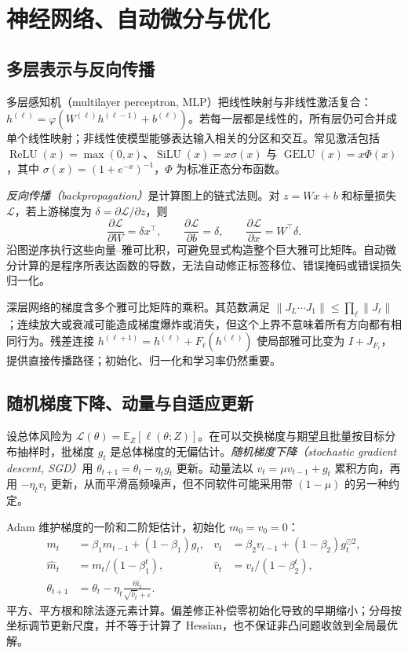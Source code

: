 \setcounter{chapter}{2} %
\chapter{神经网络、自动微分与优化}
\label{ch:optimization}

\section{多层表示与反向传播}

多层感知机（multilayer perceptron, MLP）把线性映射与非线性激活复合：$h^{(\ell)}=\varphi(W^{(\ell)}h^{(\ell-1)}+b^{(\ell)})$。若每一层都是线性的，所有层仍可合并成单个线性映射；非线性使模型能够表达输入相关的分区和交互。常见激活包括 $\operatorname{ReLU}(x)=\max(0,x)$、$\operatorname{SiLU}(x)=x\sigma(x)$ 与 $\operatorname{GELU}(x)=x\Phi(x)$，其中 $\sigma(x)=(1+e^{-x})^{-1}$，$\Phi$ 为标准正态分布函数。

\emph{反向传播（backpropagation）}是计算图上的链式法则。对 $z=Wx+b$ 和标量损失 $\mathcal L$，若上游梯度为 $\delta=\partial\mathcal L/\partial z$，则
\[
\frac{\partial\mathcal L}{\partial W}=\delta x^\top,\qquad
\frac{\partial\mathcal L}{\partial b}=\delta,\qquad
\frac{\partial\mathcal L}{\partial x}=W^\top\delta.
\]
沿图逆序执行这些向量--雅可比积，可避免显式构造整个巨大雅可比矩阵。自动微分计算的是程序所表达函数的导数，无法自动修正标签移位、错误掩码或错误损失归一化。

深层网络的梯度含多个雅可比矩阵的乘积。其范数满足 $\|J_L\cdots J_1\|\le\prod_\ell\|J_\ell\|$；连续放大或衰减可能造成梯度爆炸或消失，但这个上界不意味着所有方向都有相同行为。残差连接 $h^{(\ell+1)}=h^{(\ell)}+F_\ell(h^{(\ell)})$ 使局部雅可比变为 $I+J_{F_\ell}$，提供直接传播路径；初始化、归一化和学习率仍然重要。

\section{随机梯度下降、动量与自适应更新}

设总体风险为 $\mathcal L(\theta)=\mathbb E_Z[\ell(\theta;Z)]$。在可以交换梯度与期望且批量按目标分布抽样时，批梯度 $g_t$ 是总体梯度的无偏估计。\emph{随机梯度下降（stochastic gradient descent, SGD）}用 $\theta_{t+1}=\theta_t-\eta_tg_t$ 更新。动量法以 $v_t=\mu v_{t-1}+g_t$ 累积方向，再用 $-\eta_tv_t$ 更新，从而平滑高频噪声，但不同软件可能采用带 $(1-\mu)$ 的另一种约定。

Adam 维护梯度的一阶和二阶矩估计，初始化 $m_0=v_0=0$：
\begin{align}
m_t&=\beta_1m_{t-1}+(1-\beta_1)g_t, &
v_t&=\beta_2v_{t-1}+(1-\beta_2)g_t^{\odot2},\\
\widehat m_t&=m_t/(1-\beta_1^t), &
\widehat v_t&=v_t/(1-\beta_2^t),\\
\theta_{t+1}&=\theta_t-\eta_t\frac{\widehat m_t}{\sqrt{\widehat v_t}+\varepsilon}.&&
\end{align}
平方、平方根和除法逐元素计算。偏差修正补偿零初始化导致的早期缩小；分母按坐标调节更新尺度，并不等于计算了 Hessian，也不保证非凸问题收敛到全局最优解。

